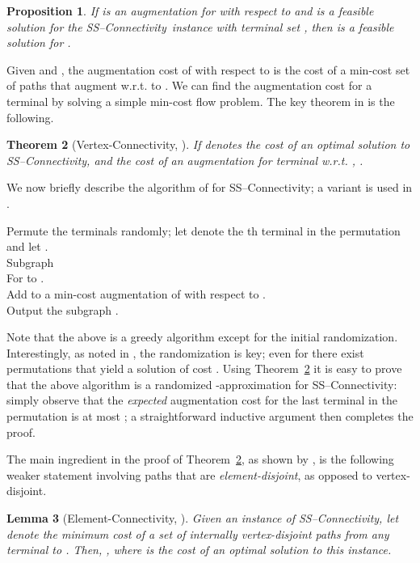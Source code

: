 \documentclass[11pt]{article}
\newtheorem{lemma}{Lemma}[section]
\newtheorem{theorem}[lemma]{Theorem}
\newtheorem{prop}[lemma]{Proposition}
\newcommand{\sskconn}{{\sc SS--Connectivity}}
\begin{document}
\begin{prop}
  \label{prop:aug}
  If  is an augmentation for  with respect
  to  and  is a feasible solution for the \sskconn\ instance
  with terminal set , then  is a feasible
  solution for .
\end{prop}

Given  and , the augmentation cost of  with respect to 
is the cost of a min-cost set of paths that augment  w.r.t. to
. We can find the augmentation cost for a terminal  by solving
a simple min-cost flow problem. The key theorem in
\cite{ChuzhoyK08} is the following.

\begin{theorem}[Vertex-Connectivity, \cite{ChuzhoyK08}] 
  \label{thm:kconnAug}
  If  denotes the cost of an optimal solution to \sskconn, and
   the cost of an augmentation for terminal  w.r.t. , .
\end{theorem}

We now briefly describe the algorithm of \cite{ChekuriK08} for
\sskconn; a variant is used in \cite{ChakCK08, ChuzhoyK08}. 

\vspace{-0.1in}
\begin{algo}
  Permute the terminals randomly; let  denote the th terminal in
  the permutation and let . \\
  Subgraph \\
  For  to . \+ \\
    Add to  a min-cost augmentation of  with respect to
    . \- \\
  Output the subgraph .
\end{algo}

Note that the above is a greedy algorithm except for the initial
randomization. Interestingly, as noted in \cite{ChekuriK08}, the
randomization is key; even for  there exist permutations that
yield a solution of cost . Using
Theorem~\ref{thm:kconnAug} it is easy to prove that the above
algorithm is a randomized -approximation for \sskconn:
simply observe that the \emph{expected} augmentation cost for the last
terminal in the permutation is at most ; a
straightforward inductive argument then completes the proof. 


The main ingredient in the proof of Theorem~\ref{thm:kconnAug}, as
shown by \cite{ChuzhoyK08}, is the following weaker statement
involving paths that are \emph{element-disjoint}, as opposed to
vertex-disjoint.

\begin{lemma}[Element-Connectivity, \cite{ChuzhoyK08}]
  \label{lem:elemConnectivity}
  Given an instance of \sskconn, let  denote the minimum
  cost of a set of  internally vertex-disjoint paths from any terminal
   to . Then, , where  is the cost of an optimal solution to this
  instance.
\end{lemma}
\end{document}
